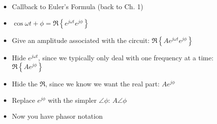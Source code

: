 \begin{itemize}
\item Callback to Euler's Formula (back to Ch. 1)
\item $\cos{\omega t + \phi} = \Re \left\{ e^{j\omega t}e^{j\phi} \right\}$
\item Give an amplitude associated with the circuit:
  $\Re \left\{ A e^{j\omega t}e^{j\phi} \right\}$
\item Hide $e^{j\omega t}$, since we typically only deal with one frequency at a time:
  $\Re \left\{ A e^{j\phi} \right\}$
\item Hide the $\Re$, since we know we want the real part:
  $Ae^{j\phi}$
\item Replace $e^{j\phi}$ with the simpler $\angle\phi$:
  $A\angle\phi$
\item Now you have phasor notation
\end{itemize}
